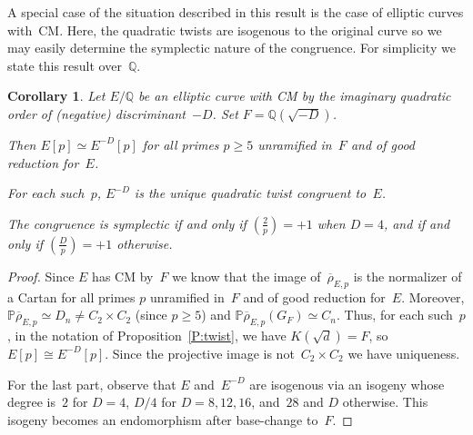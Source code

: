 \documentclass[12pt, reqno]{amsart}
\newcommand{\PP}{\mathbb{P}}
\newcommand{\Q}{\mathbb{Q}}
\newcommand{\rhobar}{{\overline{\rho}}}
\def\legendre#1#2{\left(\displaystyle\frac{#1}{#2}\right)}
\numberwithin{equation}{section}
\newtheorem{corollary}[theorem]{Corollary}
\theoremstyle{definition}
\theoremstyle{remark}
\begin{document}
A special case of the situation described in this result is the case
of elliptic curves with~CM.  Here, the quadratic twists are isogenous
to the original curve so we may easily determine the symplectic nature
of the congruence.  For simplicity we state this result over~$\Q$.

\begin{corollary}\label{C:CM-twist}
  Let $E/\Q$ be an elliptic curve with CM by the
  imaginary quadratic order of (negative) discriminant~$-D$.  Set
  $F=\Q(\sqrt{-D})$.

  Then $E[p] \simeq E^{-D}[p]$ for all primes $p \geq 5$ unramified
  in~$F$ and of good reduction for~$E$.

  For each such~$p$, $E^{-D}$ is the unique quadratic twist congruent
  to~$E$.

  The congruence is symplectic if and only if $\legendre{2}{p}=+1$
  when $D=4$, and if and only if $\legendre{D}{p}=+1$ otherwise.
\end{corollary}
\begin{proof}
Since $E$ has CM by~$F$ we know that the image of~$\rhobar_{E,p}$ is
the normalizer of a Cartan for all primes $p$ unramified in~$F$ and of
good reduction for~$E$.  Moreover, $\PP \rhobar_{E,p} \simeq D_n \neq
C_2 \times C_2$ (since $p \geq 5$) and $\PP \rhobar_{E,p}(G_F) \simeq
C_n$. Thus, for each such~$p$, in the notation of
Proposition~\ref{P:twist}, we have $K(\sqrt{d})=F$, so $E[p]\cong
E^{-D}[p]$.  Since the projective image is not~$C_2\times C_2$ we have
uniqueness.

For the last part, observe that $E$ and~$E^{-D}$ are isogenous via an
isogeny whose degree is~$2$ for $D=4$, $D/4$ for $D=8,12,16$, and~$28$
and $D$ otherwise.  This isogeny becomes an endomorphism after
base-change to~$F$.
\end{proof}

\begin{comment}
Explanation of the isogeny degree:  we look for an element of the
order which is primitive (not divisible within the order by any
integer >1) so that the kernel is cyclic, and on which Galois acts as
it does on the twist isomorphism.  Apart from D=4 the latter
con-diction means that the element must be pure imaginary, which
uniquely determines it up to sign.  For D=4 we need a primitive
element of Z[i] whose conjugate is misapplied by i or -i.

D = 4: 1+i, norm 2
D = 16: 2i, norm 4

D = 8: Surat{-2}, norm 2

D = 3 and 12: Surat{-3}, norm 3
D = 27: 3*sqrt{-3}, norm 27

D = 7 and 28: sqrt{-7], norm 7

D = p = 11, 19, 43, 67, 163: sqrt{-p}, norm p

The fact of 4 for D=16,8,12,28 does not affect the Legendre symbol but
the factor of 2 for D=4 does!
\end{comment}
\end{document}
